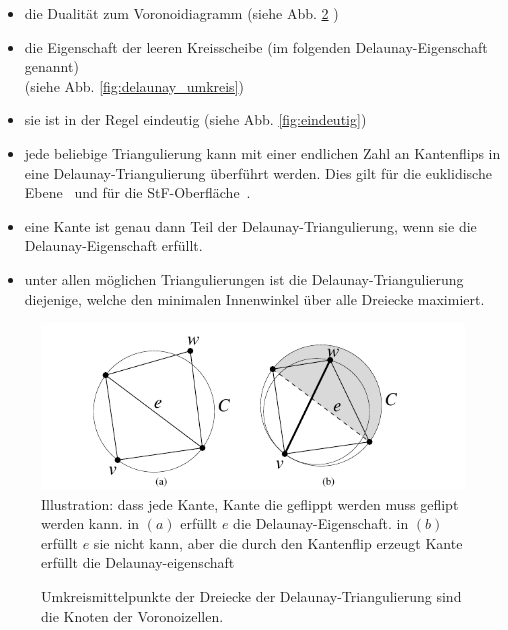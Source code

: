 \begin{itemize}
    \item die Dualität zum Voronoidiagramm (siehe Abb. \ref{fig:delaunay_voronoi}  ) \cite{indermitte:2001:voronoi,aurenhammer:2000:voronoi}
    \item die Eigenschaft der leeren Kreisscheibe (im folgenden Delaunay-Eigenschaft genannt)\\(siehe Abb. \ref{fig:delaunay_umkreis})
    \item sie ist in der Regel eindeutig (siehe Abb. \ref{fig:eindeutig})
    \item jede beliebige Triangulierung kann mit einer endlichen Zahl an Kantenflips in eine Delaunay-Triangulierung überführt werden. Dies gilt für die euklidische Ebene~\cite{shewchuk:1997:delaunay} und für die StF-Oberfläche~\cite{Bobenko:2007:LaplaceBeltrami}.
    \item eine Kante ist genau dann Teil der Delaunay-Triangulierung,  wenn sie die Delaunay-Eigenschaft erfüllt. 
    \item unter allen möglichen Triangulierungen ist die Delaunay-Triangulierung diejenige, welche den minimalen Innenwinkel über alle Dreiecke maximiert. 
\end{itemize}
 
 
 \begin{figure}[H]
    \centering
    \includegraphics[width=5in]{images/lokal_delaunay.png}
    \caption{Illustration: dass jede Kante, Kante die geflippt werden muss geflipt werden kann. in $(a)$ erfüllt $e$ die Delaunay-Eigenschaft. in $(b)$ erfüllt $e$ sie nicht kann, aber die durch den Kantenflip erzeugt Kante erfüllt die Delaunay-eigenschaft~\cite{shewchuk:1997:delaunay} }
    \label{fig:lokal_delaunay}
\end{figure}


\begin{figure}[h]%
    \centering
  
  \caption{ Umkreismittelpunkte der Dreiecke der Delaunay-Triangulierung sind die Knoten  der Voronoizellen.\cite{Hferee:2011:delaunay-voronoi}}
  \label{fig:delaunay_voronoi}
\end{figure}

